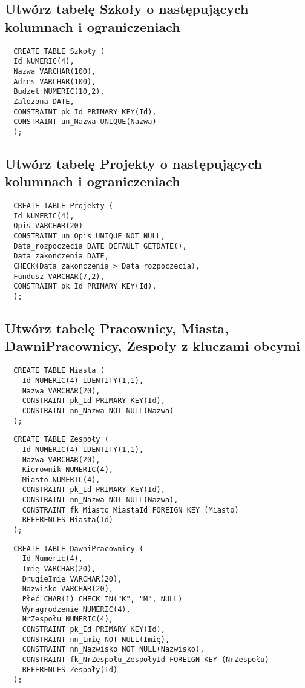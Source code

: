 \documentclass{article}
\begin{document}
\subsection{Utwórz tabelę Szkoły o następujących kolumnach i ograniczeniach}

\begin{verbatim}
  CREATE TABLE Szkoły (
  Id NUMERIC(4),
  Nazwa VARCHAR(100),
  Adres VARCHAR(100),
  Budzet NUMERIC(10,2),
  Zalozona DATE,
  CONSTRAINT pk_Id PRIMARY KEY(Id),
  CONSTRAINT un_Nazwa UNIQUE(Nazwa)
  ); 
\end{verbatim}
\subsection{Utwórz tabelę Projekty o następujących kolumnach i ograniczeniach}

\begin{verbatim}
  CREATE TABLE Projekty (
  Id NUMERIC(4),
  Opis VARCHAR(20)
  CONSTRAINT un_Opis UNIQUE NOT NULL,
  Data_rozpoczecia DATE DEFAULT GETDATE(),
  Data_zakonczenia DATE,
  CHECK(Data_zakonczenia > Data_rozpoczecia),
  Fundusz VARCHAR(7,2),
  CONSTRAINT pk_Id PRIMARY KEY(Id),
  );
\end{verbatim}

\subsection{Utwórz tabelę Pracownicy, Miasta, DawniPracownicy, Zespoły z kluczami obcymi}

\begin{verbatim}
  CREATE TABLE Miasta (
    Id NUMERIC(4) IDENTITY(1,1),
    Nazwa VARCHAR(20),
    CONSTRAINT pk_Id PRIMARY KEY(Id),
    CONSTRAINT nn_Nazwa NOT NULL(Nazwa)
  );
\end{verbatim}

\begin{verbatim}
  CREATE TABLE Zespoły (
    Id NUMERIC(4) IDENTITY(1,1),
    Nazwa VARCHAR(20),
    Kierownik NUMERIC(4),
    Miasto NUMERIC(4),
    CONSTRAINT pk_Id PRIMARY KEY(Id),
    CONSTRAINT nn_Nazwa NOT NULL(Nazwa),
    CONSTRAINT fk_Miasto_MiastaId FOREIGN KEY (Miasto)
    REFERENCES Miasta(Id)
  );
\end{verbatim}

\begin{verbatim}
  CREATE TABLE DawniPracownicy (
    Id Numeric(4),
    Imię VARCHAR(20),
    DrugieImię VARCHAR(20),
    Nazwisko VARCHAR(20),
    Płeć CHAR(1) CHECK IN("K", "M", NULL)
    Wynagrodzenie NUMERIC(4),
    NrZespołu NUMERIC(4),
    CONSTRAINT pk_Id PRIMARY KEY(Id),
    CONSTRAINT nn_Imię NOT NULL(Imię),
    CONSTRAINT nn_Nazwisko NOT NULL(Nazwisko),
    CONSTRAINT fk_NrZespołu_ZespołyId FOREIGN KEY (NrZespołu)
    REFERENCES Zespoły(Id)
  ); 
\end{verbatim}
\end{document}
